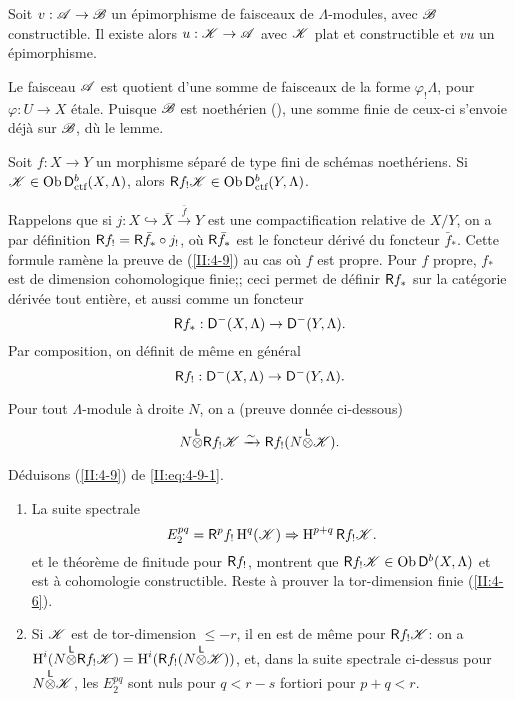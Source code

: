 \begin{lemma_}\label{II:4-8}
Soit $v:\mathscr{A}\to \mathscr{B}$ un \'epimorphisme de faisceaux de $\Lambda$-modules, avec 
$\mathscr{B}$ constructible. Il existe alors $u:\mathscr{K}\to \mathscr{A}$ avec $\mathscr{K}$ plat et 
constructible et $v u$ un \'epimorphisme. 
\end{lemma_}

Le faisceau $\mathscr{A}$ est quotient d'une somme de faisceaux de la forme 
$\varphi_! \Lambda$, pour $\varphi:U\to X$ \'etale. Puisque $\mathscr{B}$ est noeth\'erien 
(\cite[IX.2.10]{sga4}), une somme finie de ceux-ci s'envoie d\'ej\`a sur $\mathscr{B}$, 
d\`u le lemme. 





\begin{theorem_}\label{II:4-9}
Soit $f:X\to Y$ un morphisme s\'epar\'e de type fini de sch\'emas noeth\'eriens. 
Si $\mathscr{K}\in\operatorname{Ob}\mathsf{D}_\textnormal{ctf}^b(X,\Lambda)$, alors 
$\mathsf{R} f_!\mathscr{K}\in \operatorname{Ob}\mathsf{D}_\textnormal{ctf}^b(Y,\Lambda)$. 
\end{theorem_}

Rappelons que si $j:X\hookrightarrow \bar X \xrightarrow{\bar f} Y$ est une 
compactification relative de $X/Y$, on a par d\'efinition 
$\mathsf{R} f_! = \mathsf{R} \bar f_* \circ j_!$, o\`u $\mathsf{R} \bar f_*$ est le foncteur d\'eriv\'e 
du foncteur $\bar f_*$. Cette formule ram\`ene la preuve de (\ref{II:4-9}) 
au cas o\`u $f$ est propre. Pour $f$ propre, $f_*$ est de dimension 
cohomologique finie;; ceci permet de d\'efinir $\mathsf{R} f_*$ sur la cat\'egorie 
d\'eriv\'ee tout enti\`ere, et aussi comme un foncteur 
\[
  \mathsf{R} f_* : \mathsf{D}^-(X,\Lambda) \to \mathsf{D}^-(Y,\Lambda) \text{.}
\]
Par composition, on d\'efinit de m\^eme en g\'en\'eral 
\[
  \mathsf{R} f_! : \mathsf{D}^-(X,\Lambda) \to \mathsf{D}^-(Y,\Lambda) \text{.}
\]

Pour tout $\Lambda$-module \`a droite $N$, on a (preuve donn\'ee ci-dessous) 
\begin{equation}\label{II:eq:4-9-1}
  N{\overset{\mathsf{L}}{\otimes}} \mathsf{R} f_! \mathscr{K} \xrightarrow\sim \mathsf{R} f_! (N{\overset{\mathsf{L}}{\otimes}} \mathscr{K}) \text{.}
\end{equation}

D\'eduisons (\ref{II:4-9}) de \eqref{II:eq:4-9-1}. 
\begin{enumerate}[\indent a)]
  \item La suite spectrale 
    \[
      E_2^{p q} = \mathsf{R}^p f_! \operatorname{H}^q(\mathscr{K}) \Rightarrow \operatorname{H}^{p+q} \mathsf{R} f_! \mathscr{K} \text{.}
    \]
    et le th\'eor\`eme de finitude pour $\mathsf{R} f_!$, montrent que 
    $\mathsf{R} f_!\mathscr{K}\in \operatorname{Ob} \mathsf{D}^b(X,\Lambda)$ et est \`a cohomologie constructible. 
    Reste \`a prouver la tor-dimension finie (\ref{II:4-6}). 
  \item Si $\mathscr{K}$ est de tor-dimension $\leqslant -r$, il en est de m\^eme pour 
    $\mathsf{R} f_! \mathscr{K}$: on a $\operatorname{H}^i(N{\overset{\mathsf{L}}{\otimes}} \mathsf{R} f_! \mathscr{K}) = \operatorname{H}^i(\mathsf{R} f_!(N{\overset{\mathsf{L}}{\otimes}} \mathscr{K}))$, 
    et, dans la suite spectrale ci-dessus pour $N{\overset{\mathsf{L}}{\otimes}} \mathscr{K}$, les 
    $E_2^{p q}$ sont nuls pour $q<r-s$ fortiori pour $p+q<r$. 
\end{enumerate}

